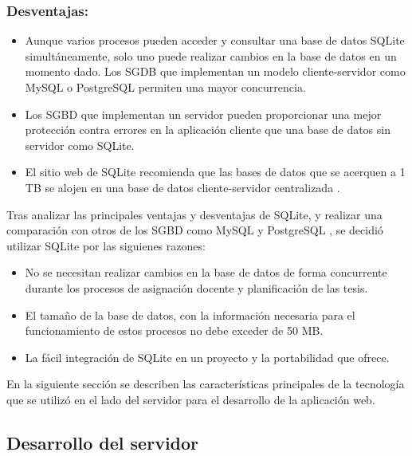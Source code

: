 \subsubsection{Desventajas:}
\begin{itemize}
    \item Aunque varios procesos pueden acceder y consultar una base de datos SQLite simultáneamente, solo 
    uno puede realizar cambios en la base de datos en un momento dado. Los SGDB que implementan un modelo cliente-servidor como MySQL o
    PostgreSQL permiten una mayor concurrencia.
    \item Los SGBD que implementan un servidor pueden proporcionar una mejor protección contra errores en la aplicación 
    cliente que una base de datos sin servidor como SQLite.
    \item El sitio web de SQLite recomienda que las bases de datos que se acerquen a 1 TB se alojen en una base de datos 
    cliente-servidor centralizada \cite{sqlite_appropriate_use}.
\end{itemize}

Tras analizar las principales ventajas y desventajas de SQLite, y realizar una comparación con otros 
de los SGBD como MySQL \cite{mysql} y PostgreSQL \cite{postgresql}, se decidió utilizar SQLite
por las siguienes razones:

\begin{itemize}
    \item No se necesitan realizar cambios en la base de datos de forma concurrente durante los 
    procesos de asignación docente y planificación de las tesis. 
    \item El tamaño de la base de datos, con la información necesaria 
    para el funcionamiento de estos procesos no debe exceder de 50 MB.
    \item La fácil integración de SQLite en un proyecto y la portabilidad que ofrece.
\end{itemize}

En la siguiente sección se describen las características 
principales de la tecnología 
que se utilizó en el lado del servidor para el desarrollo de la aplicación web.


\subsection{Desarrollo del servidor}


